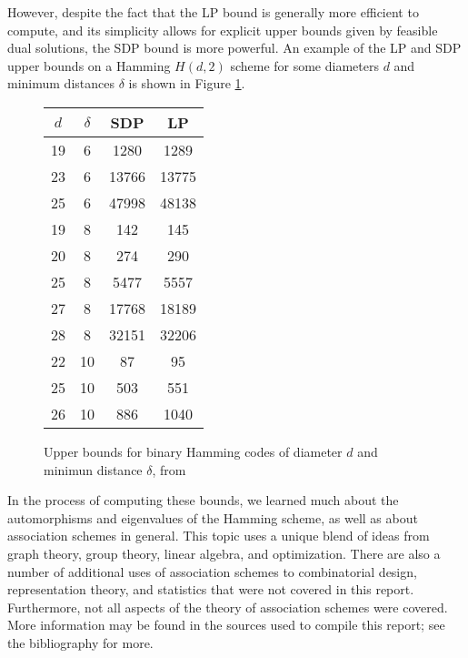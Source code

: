 \documentclass{report}
\begin{document}
  However, despite the fact that the LP bound is generally more efficient to
  compute, and its simplicity allows for explicit upper bounds given by feasible
  dual solutions, the SDP bound is more powerful.  An example of the LP and SDP
  upper bounds on a Hamming $H(d, 2)$ scheme for some diameters $d$ and minimum
  distances $\delta$ is shown in Figure \ref{fig:results}.

  \begin{figure}[h]
    \centering
    \begin{tabular}{|c|c|c|c|}
      \hline
      $d$ & $\delta$ & SDP   & LP \\
      \hline
      19  & 6        & 1280  & 1289 \\
      23  & 6        & 13766 & 13775 \\
      25  & 6        & 47998 & 48138 \\
      \hline
      19  & 8        & 142   & 145 \\
      20  & 8        & 274   & 290 \\
      25  & 8        & 5477  & 5557 \\
      27  & 8        & 17768 & 18189 \\
      28  & 8        & 32151 & 32206 \\
      \hline
      22  & 10       & 87    & 95 \\
      25  & 10       & 503   & 551 \\
      26  & 10       & 886   & 1040 \\
      \hline
    \end{tabular}
    \caption{Upper bounds for binary Hamming codes of diameter $d$ and minimun
      distance $\delta$, from \cite[Table~I]{schrijver}}
    \label{fig:results}
  \end{figure}

  In the process of computing these bounds, we learned much about the
  automorphisms and eigenvalues of the Hamming scheme, as well as about
  association schemes in general.  This topic uses a unique blend of ideas from
  graph theory, group theory, linear algebra, and optimization.  There are also
  a number of additional uses of association schemes to combinatorial design,
  representation theory, and statistics that were not covered in this report.
  Furthermore, not all aspects of the theory of association schemes were
  covered.  More information may be found in the sources used to compile this
  report; see the bibliography for more.

\appendix
\end{document}
